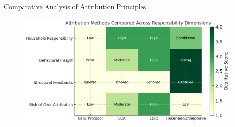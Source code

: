 \documentclass{beamer}
\begin{document}
\begin{frame}{Comparative Analysis of Attribution Principles}
\small
\vspace{-2.5em}
\begin{figure}
  \centering
  \includegraphics[width=\linewidth]{Heatmap Res.png}
  \footnotesize
\end{figure}
\footnotesize
\end{frame}
\end{document}

